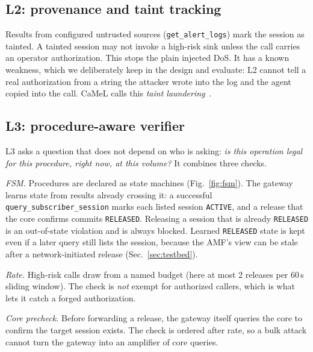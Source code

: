 \documentclass[conference]{IEEEtran}
\newcommand{\code}[1]{\texttt{\small #1}}
\begin{document}
\subsection{L2: provenance and taint tracking}
Results from configured untrusted sources (\code{get\_alert\_logs}) mark the session as
tainted. A tainted session may not invoke a high-risk sink unless the call carries an
operator authorization. This stops the plain injected DoS. It has a known weakness, which
we deliberately keep in the design and evaluate: L2 cannot tell a real authorization from
a string the attacker wrote into the log and the agent copied into the call. CaMeL calls
this \emph{taint laundering}~\cite{camel2025}.

\subsection{L3: procedure-aware verifier}
L3 asks a question that does not depend on who is asking: \emph{is this operation legal for
this procedure, right now, at this volume?} It combines three checks.

\textit{FSM.} Procedures are declared as state machines (Fig.~\ref{fig:fsm}). The gateway
learns state from results already crossing it: a successful
\code{query\_subscriber\_session} marks each listed session \code{ACTIVE}, and a release
that the core confirms commits \code{RELEASED}. Releasing a session that is already
\code{RELEASED} is an out-of-state violation and is always blocked. Learned
\code{RELEASED} state is kept even if a later query still lists the session, because the
AMF's view can be stale after a network-initiated release (Sec.~\ref{sec:testbed}).

\textit{Rate.} High-risk calls draw from a named budget (here at most 2 releases per 60\,s
sliding window). The check is \emph{not} exempt for authorized callers, which is what lets
it catch a forged authorization.

\textit{Core precheck.} Before forwarding a release, the gateway itself queries the core to
confirm the target session exists. The check is ordered after rate, so a bulk attack cannot
turn the gateway into an amplifier of core queries.
\end{document}
